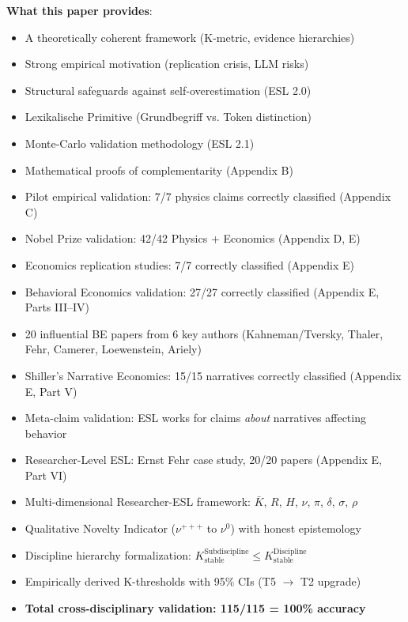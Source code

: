 \documentclass[11pt,a4paper]{article}
\begin{document}
\textbf{What this paper provides}:
\begin{itemize}
    \item A theoretically coherent framework (K-metric, evidence hierarchies)
    \item Strong empirical motivation (replication crisis, LLM risks)
    \item Structural safeguards against self-overestimation (ESL 2.0)
    \item Lexikalische Primitive (Grundbegriff vs. Token distinction)
    \item Monte-Carlo validation methodology (ESL 2.1)
    \item Mathematical proofs of complementarity (Appendix B)
    \item Pilot empirical validation: 7/7 physics claims correctly classified (Appendix C)
    \item Nobel Prize validation: 42/42 Physics + Economics (Appendix D, E)
    \item Economics replication studies: 7/7 correctly classified (Appendix E)
    \item Behavioral Economics validation: 27/27 correctly classified (Appendix E, Parts III--IV)
    \item 20 influential BE papers from 6 key authors (Kahneman/Tversky, Thaler, Fehr, Camerer, Loewenstein, Ariely)
    \item Shiller's Narrative Economics: 15/15 narratives correctly classified (Appendix E, Part V)
    \item Meta-claim validation: ESL works for claims \textit{about} narratives affecting behavior
    \item Researcher-Level ESL: Ernst Fehr case study, 20/20 papers (Appendix E, Part VI)
    \item Multi-dimensional Researcher-ESL framework: $\bar{K}$, $R$, $H$, $\nu$, $\pi$, $\delta$, $\sigma$, $\rho$
    \item Qualitative Novelty Indicator ($\nu^{+++}$ to $\nu^{0}$) with honest epistemology
    \item Discipline hierarchy formalization: $K_{\text{stable}}^{\text{Subdiscipline}} \leq K_{\text{stable}}^{\text{Discipline}}$
    \item Empirically derived K-thresholds with 95\% CIs (T5 $\to$ T2 upgrade)
    \item \textbf{Total cross-disciplinary validation: 115/115 = 100\% accuracy}
\end{itemize}
\end{document}
